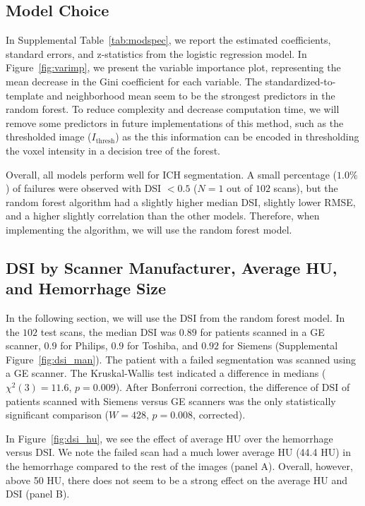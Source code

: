 \documentclass{elsarticle_nonatbib}\usepackage[]{graphicx}\usepackage[]{color}
\begin{document}
\subsection{Model Choice}
In Supplemental Table~\ref{tab:modspec}, we report the estimated coefficients, standard errors, and z-statistics from the logistic regression model.  In Figure~\ref{fig:varimp}, we present the variable importance plot, representing the mean decrease in the Gini coefficient for each variable.  The standardized-to-template and neighborhood mean seem to be the strongest predictors in the random forest.  To reduce complexity and decrease computation time, we will remove some predictors in future implementations of this method, such as the thresholded image ($I_{\text{thresh}}$) as the this information can be encoded in thresholding the voxel intensity in a decision tree of the forest.

Overall, all models perform well for ICH segmentation.  A small percentage ($1.0\%$) of failures were observed with DSI $< 0.5$ ($N = 1$ out of $102$ scans), but the random forest algorithm had a slightly higher median DSI, slightly lower RMSE, and a higher slightly correlation than the other models.  Therefore, when implementing the algorithm, we will use the random forest model.



\subsection{DSI by Scanner Manufacturer, Average HU, and Hemorrhage Size}
In the following section, we will use the DSI from the random forest model.  In the $102$ test scans, the median DSI was $0.89$ for patients scanned in a GE scanner, $0.9$ for Philips, $0.9$ for Toshiba, and $0.92$ for Siemens (Supplemental Figure~\ref{fig:dsi_man}).  The patient with a failed segmentation was scanned using a GE scanner.  The Kruskal-Wallis test indicated a difference in medians ($\chi^2(3) = 11.6
$, $p = 0.009$).  After Bonferroni correction, the difference of DSI of patients scanned with Siemens versus GE scanners was the only statistically significant comparison ($W = 428
$, $p = 0.008$, corrected).



In Figure~\ref{fig:dsi_hu}, we see the effect of average HU over the hemorrhage versus DSI.  We note the failed scan had a much lower average HU (44.4 HU) in the hemorrhage compared to the rest of the images (panel A).  Overall, however, above 50 HU, there does not seem to be a strong effect on the average HU and DSI (panel B).
\end{document}
